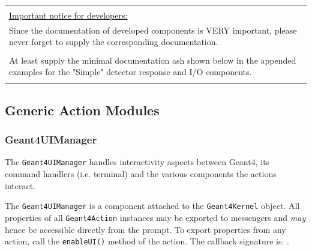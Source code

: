 \documentclass[10pt,a4paper]{article}
\begin{document}
\vspace{5cm}

\begin{center}
{\large{\bf{
\begin{tabular} {| p{15cm} |}
\hline\space  \\

\noindent
{\underline{Important notice for developers:}} \\

\noindent
Since the documentation of developed components is VERY important,
please never forget to supply the corresponding documentation.\\
\\
\noindent
At least supply the minimal documentation ash shown below
in the appended examples for the "Simple" detector response and I/O
components.
\\ \space\hline 
\end{tabular}
}}}
\end{center}
\clearpage

\subsection{Generic Action Modules}
\noindent
\subsubsection{Geant4UIManager}
\noindent
The {\tt{Geant4UIManager}} handles interactivity aspects between Geant4,
its command handlers (i.e. terminal) and the various components the actions
interact.

\noindent
The {\tt{Geant4UIManager}} is a component attached to the {\tt{Geant4Kernel}}
object. All properties of all {\tt{Geant4Action}} instances may be exported to 
 messengers and {\em{may}} hence be accessible directly from 
the  prompt. To export properties from any action, call the 
{\tt{enableUI()}} method of the action.
\noindent
The callback signature is: .
\end{document}
